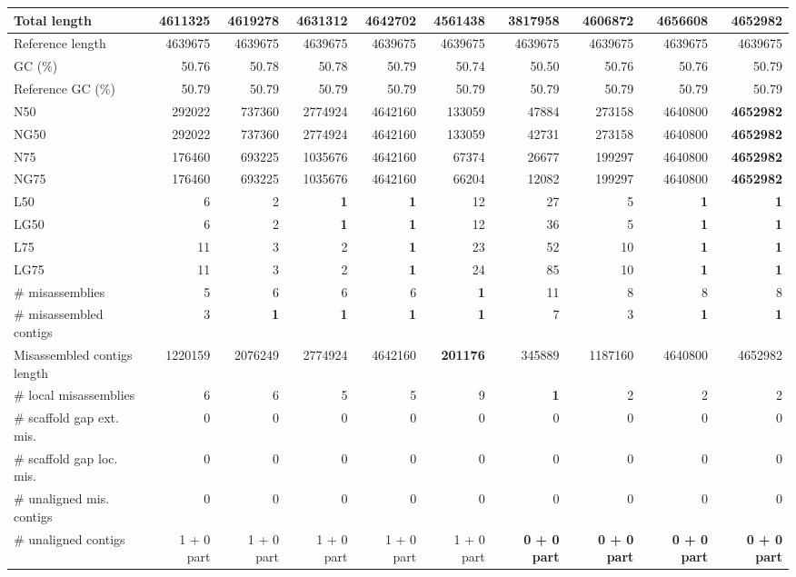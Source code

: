 \documentclass[12pt,a4paper]{article}
\begin{document}
\begin{table}[ht]
\begin{center}
\begin{tabular}{|l*{9}{|r}|}
Total length & 4611325 & 4619278 & 4631312 & 4642702 & 4561438 & 3817958 & 4606872 & {\bf 4656608} & 4652982 \\ \hline
Reference length & 4639675 & 4639675 & 4639675 & 4639675 & 4639675 & 4639675 & 4639675 & 4639675 & 4639675 \\ \hline
GC (\%) & 50.76 & 50.78 & 50.78 & 50.79 & 50.74 & 50.50 & 50.76 & 50.76 & 50.79 \\ \hline
Reference GC (\%) & 50.79 & 50.79 & 50.79 & 50.79 & 50.79 & 50.79 & 50.79 & 50.79 & 50.79 \\ \hline
N50 & 292022 & 737360 & 2774924 & 4642160 & 133059 & 47884 & 273158 & 4640800 & {\bf 4652982} \\ \hline
NG50 & 292022 & 737360 & 2774924 & 4642160 & 133059 & 42731 & 273158 & 4640800 & {\bf 4652982} \\ \hline
N75 & 176460 & 693225 & 1035676 & 4642160 & 67374 & 26677 & 199297 & 4640800 & {\bf 4652982} \\ \hline
NG75 & 176460 & 693225 & 1035676 & 4642160 & 66204 & 12082 & 199297 & 4640800 & {\bf 4652982} \\ \hline
L50 & 6 & 2 & {\bf 1} & {\bf 1} & 12 & 27 & 5 & {\bf 1} & {\bf 1} \\ \hline
LG50 & 6 & 2 & {\bf 1} & {\bf 1} & 12 & 36 & 5 & {\bf 1} & {\bf 1} \\ \hline
L75 & 11 & 3 & 2 & {\bf 1} & 23 & 52 & 10 & {\bf 1} & {\bf 1} \\ \hline
LG75 & 11 & 3 & 2 & {\bf 1} & 24 & 85 & 10 & {\bf 1} & {\bf 1} \\ \hline
\# misassemblies & 5 & 6 & 6 & 6 & {\bf 1} & 11 & 8 & 8 & 8 \\ \hline
\# misassembled contigs & 3 & {\bf 1} & {\bf 1} & {\bf 1} & {\bf 1} & 7 & 3 & {\bf 1} & {\bf 1} \\ \hline
Misassembled contigs length & 1220159 & 2076249 & 2774924 & 4642160 & {\bf 201176} & 345889 & 1187160 & 4640800 & 4652982 \\ \hline
\# local misassemblies & 6 & 6 & 5 & 5 & 9 & {\bf 1} & 2 & 2 & 2 \\ \hline
\# scaffold gap ext. mis. & 0 & 0 & 0 & 0 & 0 & 0 & 0 & 0 & 0 \\ \hline
\# scaffold gap loc. mis. & 0 & 0 & 0 & 0 & 0 & 0 & 0 & 0 & 0 \\ \hline
\# unaligned mis. contigs & 0 & 0 & 0 & 0 & 0 & 0 & 0 & 0 & 0 \\ \hline
\# unaligned contigs & 1 + 0 part & 1 + 0 part & 1 + 0 part & 1 + 0 part & 1 + 0 part & {\bf 0 + 0 part} & {\bf 0 + 0 part} & {\bf 0 + 0 part} & {\bf 0 + 0 part} \\ \hline

\end{tabular}
\end{center}
\end{table}
\end{document}
